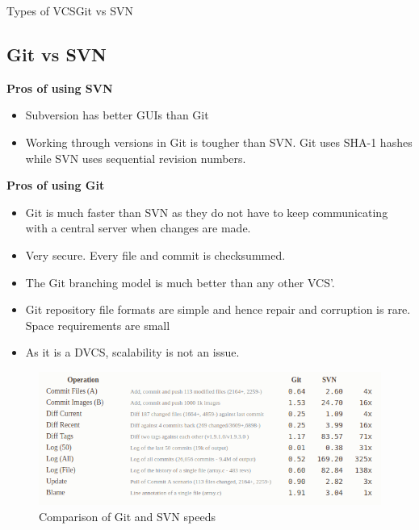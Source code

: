 \documentclass{beamer}
\begin{document}
\begin{frame}[allowframebreaks]{Types of VCS}{Git vs SVN}
\subsection{Git vs SVN}

\textbf{Pros of using SVN}
\begin{itemize}
    \item Subversion has better GUIs than Git
    \item Working through versions in Git is tougher than SVN. Git uses SHA-1 hashes while SVN uses sequential revision numbers. 
\end{itemize}
\textbf{Pros of using Git}
\begin{itemize}
    \item Git is much faster than SVN as they do not have to keep communicating with a central server when changes are made.
    \item Very secure. Every file and commit is checksummed.
    \item The Git branching model is much better than any other VCS'.
    \item Git repository file formats are simple and hence  repair and corruption is rare. Space requirements are small
    \item As it is a DVCS, scalability is not an issue. 
\end{itemize}
\framebreak
\begin{figure}
	\includegraphics[scale=0.45]{images/better-git}
	\caption{Comparison of Git and SVN speeds\cite{better}}
\end{figure}

\end{frame}
\end{document}
